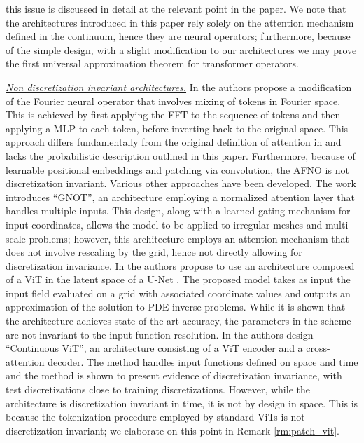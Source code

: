 \documentclass[twoside]{article}
\newcommand{\1}{\mathbbm{1}}
\begin{document}
this issue is discussed in detail at the relevant point in the paper. We note that the architectures introduced in this paper rely solely on the attention mechanism defined in the continuum, hence they are neural operators; furthermore, because of the simple design, with a slight modification to our architectures we may prove the first universal approximation theorem for transformer operators.
\par
\uline{\textit{Non discretization invariant architectures.}} In \citet{guibas2022efficient} the authors propose a modification of the Fourier neural operator that involves mixing of tokens in Fourier space. This is achieved by first applying the FFT to the sequence of tokens and then applying a MLP to each token, before inverting back to the original space. This approach differs fundamentally from the original definition of attention in \citet{vaswani2017attention} and lacks the probabilistic description outlined in this paper. Furthermore, because of learnable positional embeddings and patching via convolution, the AFNO is not discretization invariant. Various other approaches have been developed. The work \citet{hao2023gnot} introduces ``GNOT'', an architecture employing a normalized attention layer that handles multiple inputs. This design, along with a learned gating mechanism for input coordinates, allows the model to be applied to irregular meshes and multi-scale problems; however, this architecture employs an attention mechanism that does not involve rescaling by the grid, hence not directly allowing for discretization invariance. In \citet{ovadia2023vito} the authors propose to use an architecture composed of a ViT in the latent space of a U-Net \citep{ronneberger2015unet}. The proposed model takes as input the input field evaluated on a grid with associated coordinate values and outputs an approximation of the solution to PDE inverse problems. While it is shown that the architecture achieves state-of-the-art accuracy, the parameters in the scheme are not invariant to the input function resolution. In \citet{wang2025continuous} the authors design ``Continuous ViT'', an architecture consisting of a ViT encoder and a cross-attention decoder. The method handles input functions defined on space and time and the method is shown to present evidence of discretization invariance, with test discretizations close to training discretizations. However, while the architecture is discretization invariant in time, it is not by design in space. This is because the tokenization procedure employed by standard ViTs is not discretization invariant; we elaborate on this point in Remark \ref{rm:patch_vit}.
\end{document}
